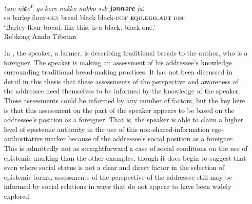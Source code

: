 \begin{exe}
    \ex \label{e:Discussion:AmdoAuth}
    \gll \textit{təxe} \textit{niɕe\textsuperscript{F}-gə} \textit{kore} \textit{nakko} \textit{nakko-sək} \textbf{\textit{jənnəre}} \textit{jaː} \\
    so barley.flour-\textsc{gen} bread black black-\textsc{indf} \textbf{\textsc{equ.ego.aut}} \textsc{disc} \\
    \glt `Barley flour bread, like this, is a black, black one.' \\
    Rebkong Amdo Tibetan \cite[Tibetic:PRC,][300]{Simon2021}
\end{exe}

In , the speaker, a farmer, is describing traditional breads to the author, who is a foreigner. The speaker is making an assessment of his addressee's knowledge surrounding traditional bread-making practices. It has not been discussed in detail in this thesis that these assessments of the perspective and awareness of the addressee need themselves to be informed by the knowledge of the speaker. These assessments could be informed by any number of factors, but the key here is that this assessment on the part of the speaker appears to be based on the addressee's position as a foreigner. That is, the speaker is able to claim a higher level of epistemic authority in the use of this non-shared-information ego-authoritative marker because of the addressee's social position as a foreigner. This is admittedly not as straightforward a case of social conditions on the use of epistemic marking than the other examples, though it does begin to suggest that even where social status is not a clear and direct factor in the selection of epistemic forms, assessments of the perspective of the addressee still may be informed by social relations in ways that do not appear to have been widely explored.

